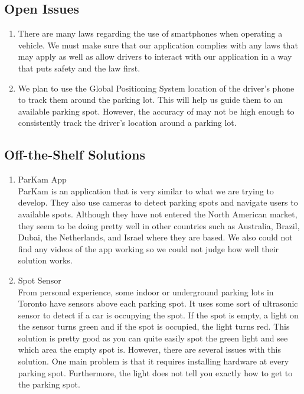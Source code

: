 \documentclass[12pt,letterpaper]{article}
\newcommand{\term}[2][]{\ifthenelse{\equal{#1}{}}{\hyperref[Term:#2]{\textbf{#2}}}{\hyperref[Term:#1]{\textbf{#2}}}}
\begin{document}
\subsection{Open Issues}
\begin{enumerate}
    \item There are many laws regarding the use of smartphones when operating a vehicle. We must make sure that our application complies with any laws that may apply as well as allow drivers to interact with our application in a way that puts safety and the law first.
    
    \item We plan to use the Global Positioning System location of the driver's phone to track them around the parking lot. This will help us guide them to an available parking spot. However, the accuracy of \term{GPS} may not be high enough to consistently track the driver's location around a parking lot.
\end{enumerate}

\subsection{Off-the-Shelf Solutions}
\begin{enumerate}
    \item ParKam App\\
    ParKam is an application that is very similar to what we are trying to develop. They also use cameras to detect parking spots and navigate users to available spots. Although they have not entered the North American market, they seem to be doing pretty well in other countries such as Australia, Brazil, Dubai, the Netherlands, and Israel where they are based. We also could not find any videos of the app working so we could not judge how well their solution works.
    
    \item Spot Sensor\\
    From personal experience, some indoor or underground parking lots in Toronto have sensors above each parking spot. It uses some sort of ultrasonic sensor to detect if a car is occupying the spot. If the spot is empty, a light on the sensor turns green and if the spot is occupied, the light turns red. This solution is pretty good as you can quite easily spot the green light and see which area the empty spot is. However, there are several issues with this solution. One main problem is that it requires installing hardware at every parking spot. Furthermore, the light does not tell you exactly how to get to the parking spot.
\end{enumerate}
\end{document}
